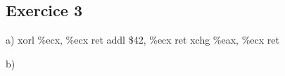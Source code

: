 

\subsection{Exercice 3}

a)  xorl \%ecx, \%ecx
    ret
    addl \$42, \%ecx
    ret
    xchg \%eax, \%ecx
    ret

b)  
